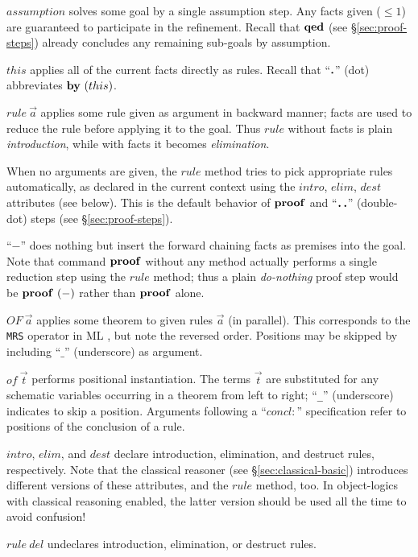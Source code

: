 \begin{descr}
\item [$assumption$] solves some goal by a single assumption step.  Any facts
  given (${} \le 1$) are guaranteed to participate in the refinement.  Recall
  that ${\mathord{\mathbf{qed}}}$ (see \S\ref{sec:proof-steps}) already concludes any
  remaining sub-goals by assumption.
\item [$this$] applies all of the current facts directly as rules.  Recall
  that ``$\textbf{.}$'' (dot) abbreviates $\BY{this}$.
\item [$rule~\vec a$] applies some rule given as argument in backward manner;
  facts are used to reduce the rule before applying it to the goal.  Thus
  $rule$ without facts is plain \emph{introduction}, while with facts it
  becomes \emph{elimination}.
  
  When no arguments are given, the $rule$ method tries to pick appropriate
  rules automatically, as declared in the current context using the $intro$,
  $elim$, $dest$ attributes (see below).  This is the default behavior of
  ${\mathord{\mathbf{proof}}}$ and ``$\textbf{.\,.}$'' (double-dot) steps (see
  \S\ref{sec:proof-steps}).
\item [``$-$''] does nothing but insert the forward chaining facts as premises
  into the goal.  Note that command ${\mathord{\mathbf{proof}}}$ without any method actually
  performs a single reduction step using the $rule$ method; thus a plain
  \emph{do-nothing} proof step would be $\PROOF{-}$ rather than ${\mathord{\mathbf{proof}}}$
  alone.
\item [$OF~\vec a$] applies some theorem to given rules $\vec a$ (in
  parallel).  This corresponds to the \texttt{MRS} operator in ML
  \cite[\S5]{isabelle-ref}, but note the reversed order.  Positions may be
  skipped by including ``$\_$'' (underscore) as argument.
\item [$of~\vec t$] performs positional instantiation.  The terms $\vec t$ are
  substituted for any schematic variables occurring in a theorem from left to
  right; ``\texttt{_}'' (underscore) indicates to skip a position.  Arguments
  following a ``$concl\colon$'' specification refer to positions of the
  conclusion of a rule.
\item [$intro$, $elim$, and $dest$] declare introduction, elimination, and
  destruct rules, respectively.  Note that the classical reasoner (see
  \S\ref{sec:classical-basic}) introduces different versions of these
  attributes, and the $rule$ method, too.  In object-logics with classical
  reasoning enabled, the latter version should be used all the time to avoid
  confusion!
\item [$rule~del$] undeclares introduction, elimination, or destruct rules.
\end{descr}


